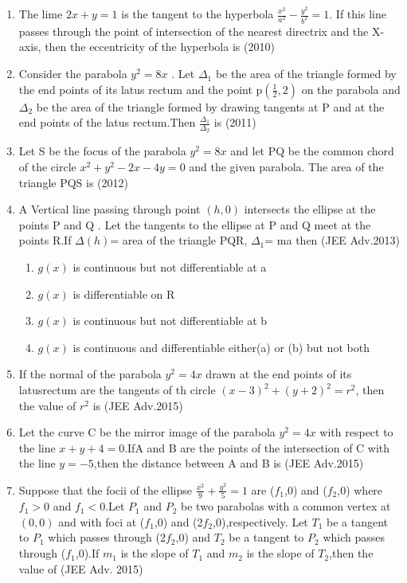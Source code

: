 \documentclass[journal,12pt,twocolumn]{IEEEtran}
\theoremstyle{remark}
\begin{document}
\begin{enumerate}
\item The lime $2x+y=1$ is the tangent to the hyperbola $\frac{x^2}{a^2}-\frac{y^2}{b^2}=1$. If this line passes through the point of intersection of the nearest directrix and the X-axis, then the eccentricity of the hyperbola is
\hfill(2010)
\item Consider the parabola $y^2=8x$ . Let $\Delta_1$ be the area of the triangle formed by the end points of its latus rectum and the point p$(\frac{1}{2},2)$ on the parabola and $\Delta_2$ be the area of the triangle formed by drawing tangents at P and at the end points of the latus rectum.Then $\frac{\Delta_1}{\Delta_2}$ is 
\hfill(2011)
\item Let S be the focus of the parabola $y^2=8x$ and let PQ be the common chord of the circle $x^2+y^2-2x-4y=0$ and the given parabola. The area of the triangle PQS is
\hfill(2012)
\item A Vertical line passing through point $(h,0)$ intersects the ellipse   at the points  P and Q . Let the tangents to the ellipse at P and Q meet at the points R.If $\Delta(h)$= area of the triangle PQR, $\Delta_1$= ma
then 
\hfill(JEE Adv.2013)
\begin{enumerate}
    \item $g(x)$ is continuous but not differentiable at a
    \item $g(x)$ is differentiable on R
    \item $g(x)$ is continuous but not differentiable at b
    \item $g(x)$ is continuous and differentiable either(a) or (b) but not both 
    \end{enumerate}
\item If the normal of the parabola $y^2=4x$ drawn at the end points of its latusrectum are the tangents of th circle $(x-3)^2+(y+2)^2=r^2$, then the value of $r^2$ is
\hfill(JEE Adv.2015)
\item Let the curve C be the mirror image of the parabola $y^2=4x$ with respect to the line $x+y+4=0$.IfA and B are the points of the intersection of C with the line $y=-5$,then the distance between A and B is
\hfill(JEE Adv.2015)
\item Suppose that the focii of the ellipse $\frac{x^2}{9}+\frac{y^2}{5}=1$ are ($f_1$,0) and ($f_2$,0) where $f_1>0$ and $f_1<0$.Let $P_1$ and $P_2$ be two parabolas with a common vertex at $(0,0)$ and with foci at ($f_1$,0) and (2$f_2$,0),respectively. Let $T_1$ be a tangent to $P_1$ which passes through (2$f_2$,0) and $T_2$ be a tangent to $P_2$ which passes through ($f_1$,0).If $m_1$ is the slope of $T_1$ and $m_2$ is the slope of $T_2$,then the value of
\hfill(JEE Adv. 2015)
\end{enumerate}
\end{document}
